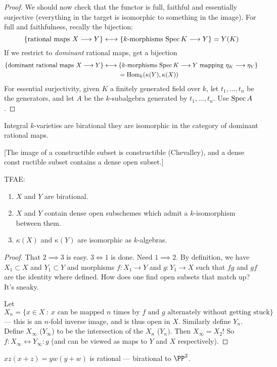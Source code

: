 \documentclass[11pt]{article}
\begin{document}
\begin{Oct18}
\begin{proof}
We should now check that the functor is full, faithful and essentially surjective (everything in the target is isomorphic to something in the image). For full and faithfulness, recally the bijection:
\[\{\text{rational maps $X\longrightarrow Y$}\}\longleftrightarrow\{\text{$k$-morphisms $\operatorname{Spec} K\longrightarrow Y$}\}=Y(K)\]
If we restrict to \emph{dominant} rational maps, get a bijection
\begin{alignat*}{2}
\{\text{dominant rational maps $X\longrightarrow Y$}\}&\longleftrightarrow\{\text{$k$-morphisms $\operatorname{Spec} K\longrightarrow Y$ mapping $\eta_K\longrightarrow \eta_Y$}\}\\
&\ \qquad=\operatorname{Hom}_k(\kappa(Y),\kappa(X))
\end{alignat*}
For essential surjectivity, given $K$ a finitely generated field over $k$, let $t_1,\ldots,t_n$ be the generators, and let $A$ be the $k$-subalgebra generated by $t_1,\ldots,t_n$. Use $\operatorname{Spec} A$.
\end{proof}
\begin{defn*}
Integral $k$-varieties are birational \Iff they are isomorphic in the category of dominant rational maps.
\end{defn*}
[The image of a constructible subset is constructible (Chevalley), and a dense const ructible subset contains a dense open subset.]
\begin{prop*} TFAE:
\begin{enumerate}\squishlist
\item $X$ and $Y$ are birational.
\item $X$ and $Y$ contain dense open subschemes which admit a $k$-isomorphism between them.
\item $\kappa(X)$ and $\kappa(Y)$ are isomorphic as $k$-algebras.
\end{enumerate}
\end{prop*}
\begin{proof}
That $2\implies 3$ is easy. $3\iff 1$ is done. Need $1\implies 2$. By definition, we have $X_1\subset X$ and $Y_1\subset Y$ and morphisms $f:X_1\to Y$ and $g:Y_1\to X$ such that $fg$ and $gf$ are the identity where defined. How does one find open subsets that match up? It's sneaky.

Let $X_n=\{x\in X\ :\ \text{$x$ can be mapped $n$ times by $f$ and $g$ alternately without getting stuck}\}$ --- this is an $n$-fold inverse image, and is thus open in $X$. Similarly define $Y_n$. Define $X_\infty$ ($Y_\infty$) to be the intersection of the $X_n$ ($Y_n)$. Then $X_\infty=X_2$! So $f:X_\infty\longleftrightarrow Y_\infty:g$ (and can be viewed as maps to $Y$ and $X$ respectively).
\end{proof}
\begin{exmp*}
$xz(x+z)=yw(y+w)$ is rational --- birational to $\PP^2$.
\end{exmp*}
\end{Oct18}
\end{document}
